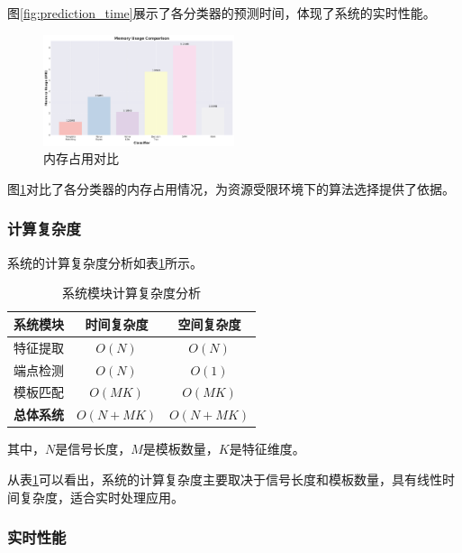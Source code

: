 \documentclass[sigconf,nonacm]{acmart}
\begin{document}
图\ref{fig:prediction_time}展示了各分类器的预测时间，体现了系统的实时性能。

\begin{figure}[htbp]
\centering
\includegraphics[width=0.5\textwidth]{performance/memory_usage.png}
\caption{内存占用对比}
\label{fig:memory_usage}
\end{figure}

图\ref{fig:memory_usage}对比了各分类器的内存占用情况，为资源受限环境下的算法选择提供了依据。

\subsubsection{计算复杂度}

系统的计算复杂度分析如表\ref{tab:complexity}所示。

\begin{table}[htbp]
\caption{系统模块计算复杂度分析}
\label{tab:complexity}
\begin{center}
\begin{tabular}{lcc}
\toprule
\textbf{系统模块} & \textbf{时间复杂度} & \textbf{空间复杂度} \\
\midrule
特征提取 & $O(N)$ & $O(N)$ \\
端点检测 & $O(N)$ & $O(1)$ \\
模板匹配 & $O(MK)$ & $O(MK)$ \\
\midrule
\textbf{总体系统} & \textbf{$O(N + MK)$} & \textbf{$O(N + MK)$} \\
\bottomrule
\end{tabular}
\end{center}
\end{table}

其中，$N$是信号长度，$M$是模板数量，$K$是特征维度。

从表\ref{tab:complexity}可以看出，系统的计算复杂度主要取决于信号长度和模板数量，具有线性时间复杂度，适合实时处理应用。

\subsubsection{实时性能}
\end{document}
